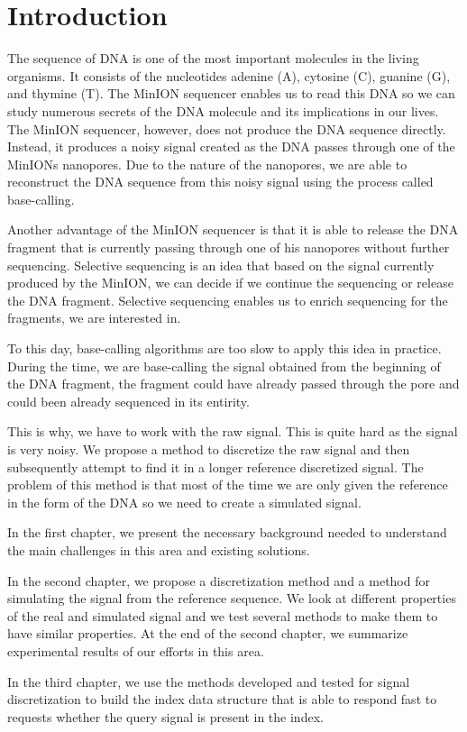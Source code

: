 \chapter*{Introduction} %

The sequence of DNA is one of the most important molecules in the living organisms. It consists
of the nucleotides adenine (A), cytosine (C), guanine (G), and thymine (T).
The MinION sequencer enables us to read this DNA so we can study numerous secrets
of the DNA molecule and its
implications in our lives. The MinION sequencer, however, does not produce the DNA
sequence directly. Instead, it produces a noisy signal created as the DNA
passes through one of the MinIONs nanopores. Due to the nature of the
nanopores, we are able to reconstruct the DNA sequence from this noisy signal
using the process called base-calling.

Another advantage of the MinION sequencer is that it is able to release the DNA fragment that is currently passing
through one of his nanopores without further sequencing. Selective sequencing is an idea that based on the
signal currently produced by the MinION, we can decide if we continue the sequencing
or release the DNA fragment. Selective sequencing enables us to enrich sequencing for the
fragments, we are interested in.

To this day, base-calling algorithms are too slow to apply this idea in practice.
During the time, we are base-calling the signal obtained
from the beginning of the DNA fragment, the fragment could have already passed
through the pore and could been already sequenced in its entirity.

This is why, we have to work with the raw signal. This is quite hard as the
signal is very noisy. We propose a method to discretize the raw signal and then subsequently
attempt to find it in a longer reference discretized signal. The problem of this method is that
most of the time we are only given the reference in the form of the DNA so we need to create a simulated signal.

In the first chapter, we present the necessary background needed to understand
the main challenges in this area and existing solutions.

In the second chapter, we propose a discretization method and a method for simulating the signal
from the reference sequence. We look at different properties of the real and simulated signal and we test several
methods to make them to have similar properties. At the end of the second chapter,
we summarize experimental results of our efforts in this area.

In the third chapter, we use the methods developed and tested for signal discretization
to build the index data structure that is able to respond fast to
requests whether the query signal is present in the index.

